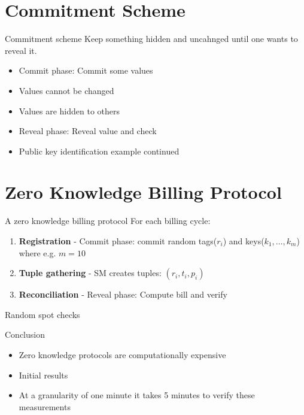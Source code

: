\documentclass[10pt]{beamer}
\begin{document}
\section{Commitment Scheme}
\begin{frame}{Commitment scheme}
  Keep something hidden and uncahnged until one wants to reveal it.
  \begin{itemize}
  \item Commit phase: Commit some values
  \item Values cannot be changed
  \item Values are hidden to others
  \item Reveal phase: Reveal value and check
  \item Public key identification example continued
  \end{itemize}
\end{frame}

\section{Zero Knowledge Billing Protocol}
\begin{frame}{A zero knowledge billing protocol}
  For each billing cycle:
  \begin{enumerate}
  \item \textbf{Registration} - Commit phase: commit random tags($r_i$) and keys($k_1, \dots, k_m$) where e.g. $m = 10$
  \item \textbf{Tuple gathering} - SM creates tuples: $(r_i, t_i, p_i)$
  \item \textbf{Reconciliation} - Reveal phase: Compute bill and verify
  \end{enumerate}
  Random spot checks
\end{frame}

\begin{frame}{Conclusion}
  \begin{itemize}
  \item Zero knowledge protocols are computationally expensive
  \item Initial results
  \item At a granularity of one minute it takes 5 minutes to verify these measurements
  \end{itemize}
\end{frame}

{\aauwavesbg
\begin{frame}
\end{frame}}
\end{document}
